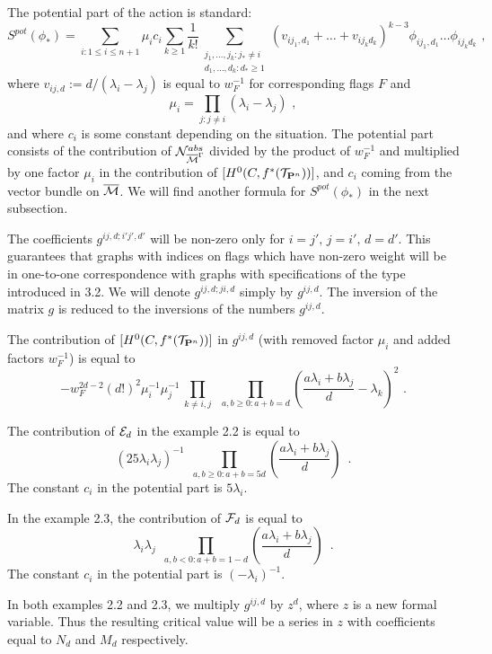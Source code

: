 \documentclass{amsart}
\begin{document}
The potential part of the action is standard:
$$S^{pot}(\phi_*)=\sum_{i:1\le i\le n+1}\mu_i c_i\sum_{k\ge 1}
\frac{1}{k!}\sum_{\substack{
j_1,\dots,j_k:j_*\ne i
\\ d_1,\dots ,d_k: d_*\ge 1
}} 
(v_{i j_1,d_1}+\dots+v_{i j_k d_k})^{k-3}
\phi_{i j_1,d_1}\dots \phi_{i j_k d_k}\,\,,$$
where $v_{ij,d}:=d/(\lambda_i-\lambda_j)$ is equal to $w_F^{-1}$
 for corresponding flags $F$
 and
$$\mu_i=\prod_{j:j\ne i}(\lambda_i-\lambda_j)\,\,,$$
and where $c_i$ is some constant depending on the situation.
 The potential part consists of the contribution of $\mathcal
N^{abs}_{\overline{\mathcal{M}}^{\Gamma}}$ divided by the product of $w_F^{-1}$
 and multiplied by one factor $\mu_i$ in the contribution of $[H^0(C,f^*(\mathcal
T_{\mathbf P^n}))]$, and $c_i$ coming from the vector bundle on $\overline{\mathcal{M}}$.
We will find another formula for   $S^{pot}(\phi_*)$ in the next subsection.

The coefficients  $g^{ij,d;i'j',d'}$ will be non-zero only for
  $i=j',\,j=i',\,d=d'$. This guarantees that graphs with indices on flags which
have non-zero weight will be in one-to-one correspondence with graphs with
specifications of the type introduced in 3.2.
We will denote $g^{ij,d;ji,d}$ simply by $g^{ij,d}$. The inversion of the
matrix $g$ is reduced to the inversions of the numbers  $g^{ij,d}$.

The contribution of $[H^0(C,f^*(\mathcal T_{\mathbf P^n}))]$ in
 $g^{ij,d}$ (with removed factor $\mu_i$ and added factors $w_F^{-1}$) is
equal to
$$-w_F^{2d-2}(d!)^2\mu_i^{-1}\mu_j^{-1}\,\prod_{k\ne i,j} \,\,\,\prod_{a,b\ge
0:a+b=d}\left(
\frac{a\lambda_i+b\lambda_j}{d}-\lambda_k\right)^2 \,\,.$$

The contribution of  $\mathcal E_d$ in the example
 2.2 is equal to
 $$(25\lambda_i\lambda_j)^{-1}\,\,\,\prod_{a,b\ge 0:a+b=5d}
\left(\frac{a\lambda_i+b\lambda_j}{d}\right)\,\, \,.$$
The constant $c_i$ in the potential part is $5\lambda_i$.

In the example 2.3, the contribution of $\mathcal F_d$ is equal to
$$\lambda_i\lambda_j\,\,\,\prod_{a,b< 0:a+b=1-d}
\left(\frac{a\lambda_i+b\lambda_j}{d}\right) \,\,\,.$$
The constant $c_i$ in the potential part is $(-\lambda_i)^{-1}$.

In both examples 2.2 and 2.3, we multiply $g^{ij,d}$ by $z^d$, where
 $z$ is a new formal variable. Thus the resulting critical value will be a
series in $z$ with coefficients equal to $N_d$ and $M_d$ respectively.
\end{document}
